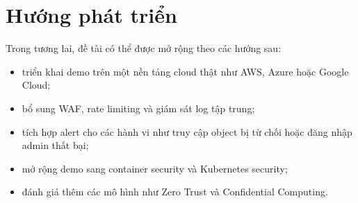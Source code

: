 \section{Hướng phát triển}
Trong tương lai, đề tài có thể được mở rộng theo các hướng sau:
\begin{itemize}
    \item triển khai demo trên một nền tảng cloud thật như AWS, Azure hoặc Google Cloud;
    \item bổ sung WAF, rate limiting và giám sát log tập trung;
    \item tích hợp alert cho các hành vi như truy cập object bị từ chối hoặc đăng nhập admin thất bại;
    \item mở rộng demo sang container security và Kubernetes security;
    \item đánh giá thêm các mô hình như Zero Trust và Confidential Computing.
\end{itemize}
